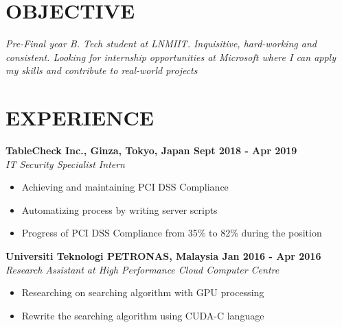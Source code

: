 \documentclass[margin]{res}
\begin{document}
\address{
\\\url{Github : https://www.github.com/louiszhenyean}
\\\url{Hackthebox : https://www.hackthebox.eu/profile/223593}
\\}
\address{
\\louiszhenyean@gmail.com
\\(+60) 19-567 5808
\\ \\}
\begin{resume}
\section{OBJECTIVE}
{\sl Pre-Final year B. Tech student at LNMIIT. Inquisitive, hard-working and consistent. Looking for internship opportunities at Microsoft where I can apply my skills and contribute to real-world projects }
\section{EXPERIENCE}
\textbf{TableCheck Inc., Ginza, Tokyo, Japan 
\hfill{Sept 2018 - Apr 2019}} \\
{\sl IT Security Specialist Intern} \vspace{-0.3cm} \\
    \begin{itemize}
        \item Achieving and maintaining PCI DSS Compliance
        \item Automatizing process by writing server scripts
        \item Progress of PCI DSS Compliance from 35\% to 82\% during the position
    \end{itemize}
\textbf{Universiti Teknologi PETRONAS, Malaysia
\hfill{Jan 2016 - Apr 2016}} \\
{\sl Research Assistant at High Performance Cloud Computer Centre} \vspace{-0.3cm} \\
    \begin{itemize}
        \item Researching on searching algorithm with GPU processing
        \item Rewrite the searching algorithm using CUDA-C language
    \end{itemize}

\end{resume}
\end{document}
